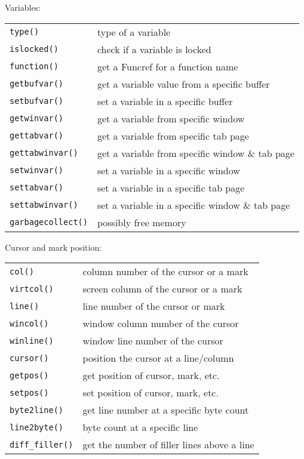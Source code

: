 Variables:
\label{var-functions}
\begin{center} \begin{tabular}{l l}
				\texttt{type()} & type of a variable \\
				\texttt{islocked()} & check if a variable is locked \\
				\texttt{function()} & get a Funcref for a function name \\
				\texttt{getbufvar()} & get a variable value from a specific buffer \\
				\texttt{setbufvar()} & set a variable in a specific buffer \\
				\texttt{getwinvar()} & get a variable from specific window \\
				\texttt{gettabvar()} & get a variable from specific tab page \\
				\texttt{gettabwinvar()} & get a variable from specific window \& tab page \\
				\texttt{setwinvar()} & set a variable in a specific window \\
				\texttt{settabvar()} & set a variable in a specific tab page \\
				\texttt{settabwinvar()} & set a variable in a specific window \& tab page \\
				\texttt{garbagecollect()} & possibly free memory \\
\end{tabular} \end{center}

Cursor and mark position:
\label{cursor-functions}
\label{mark-functions}
\begin{center} \begin{tabular}{l l}
				\texttt{col()} & column number of the cursor or a mark \\
				\texttt{virtcol()} & screen column of the cursor or a mark \\
				\texttt{line()} & line number of the cursor or mark \\
				\texttt{wincol()} & window column number of the cursor \\
				\texttt{winline()} & window line number of the cursor \\
				\texttt{cursor()} & position the cursor at a line/column \\
				\texttt{getpos()} & get position of cursor, mark, etc. \\
				\texttt{setpos()} & set position of cursor, mark, etc. \\
				\texttt{byte2line()} & get line number at a specific byte count \\
				\texttt{line2byte()} & byte count at a specific line \\
				\texttt{diff\_filler()} & get the number of filler lines above a line \\
\end{tabular} \end{center}

